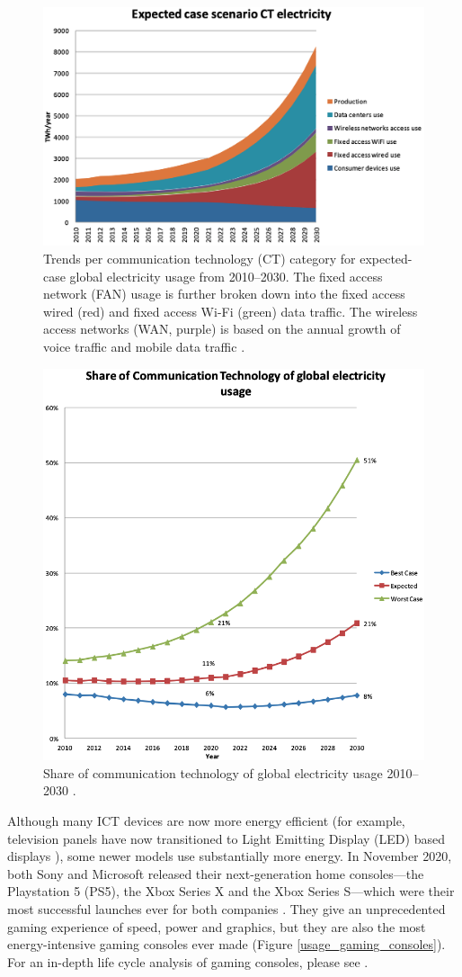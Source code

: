 \documentclass{article}
\begin{document}
\begin{figure}[h]
    \includegraphics[width=.75 \textwidth]{./images/Global_Energy_ICT_components.png}
    \centering
    \caption{Trends per communication technology (CT) category for expected-case global electricity usage from 2010–2030. The fixed access network (FAN) usage is further broken down into the fixed access wired (red) and fixed access Wi-Fi (green) data traffic. The wireless access networks (WAN, purple) is based on the annual growth of voice traffic and mobile data traffic \cite{andrae2015global}.}
    \label{Global_Energy_ICT_components}
\end{figure}

\begin{figure}[h]
    \includegraphics[width=.65 \textwidth]{./images/Global_Energy_ICT_share.png}
    \centering
    \caption{Share of communication technology of global electricity usage 2010–2030 \cite{andrae2015global}.}
    \label{Global_Energy_ICT_share}
\end{figure}

Although many ICT devices are now more energy efficient (for example, television panels have now transitioned to Light Emitting Display (LED) based displays \cite{park2013efficiency}), some newer models use substantially more energy. In November 2020, both Sony and Microsoft released their next-generation home consoles---the Playstation 5 (PS5), the Xbox Series X and the Xbox Series S---which were their most successful launches ever for both companies \cite{cnet2020gamingconsoles}. They give an unprecedented gaming experience of speed, power and graphics, but they are also the most energy-intensive gaming consoles ever made (Figure \ref{usage_gaming_consoles}). For an in-depth life cycle analysis of gaming consoles, please see \cite{aslan2020climate}.
\end{document}
